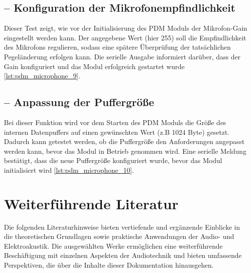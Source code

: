 \subsection{ – Konfiguration der Mikrofonempfindlichkeit}
Dieser Test zeigt, wie vor der Initialisierung des PDM Moduls der Mikrofon-Gain eingestellt werden kann. Der angegebene Wert (hier 255) soll die Empfindlichkeit des Mikrofons regulieren, sodass eine spätere Überprüfung der tatsächlichen Pegeländerung erfolgen kann. Die serielle Ausgabe informiert darüber, dass der Gain konfiguriert und das Modul erfolgreich gestartet wurde \ref{lst:pdm_microphone_9}.

{
	\label{lst:pdm_microphone_9}
}

\subsection{ – Anpassung der Puffergröße}
Bei dieser Funktion wird vor dem Starten des PDM Moduls die Größe des internen Datenpuffers auf einen gewünschten Wert (z.B 1024 Byte) gesetzt. Dadurch kann getestet werden, ob die Puffergröße den Anforderungen angepasst werden kann, bevor das Modul in Betrieb genommen wird. Eine serielle Meldung bestätigt, dass die neue Puffergröße konfiguriert wurde, bevor das Modul initialisiert wird \ref{lst:pdm_microphone_10}.

{
	\label{lst:pdm_microphone_10}
}

\section{Weiterführende Literatur}

Die folgenden Literaturhinweise bieten vertiefende und ergänzende Einblicke in die theoretischen Grundlagen sowie praktische Anwendungen der Audio- und Elektroakustik. Die ausgewählten Werke ermöglichen eine weiterführende Beschäftigung mit einzelnen Aspekten der Audiotechnik und bieten umfassende Perspektiven, die über die Inhalte dieser Dokumentation hinausgehen.

